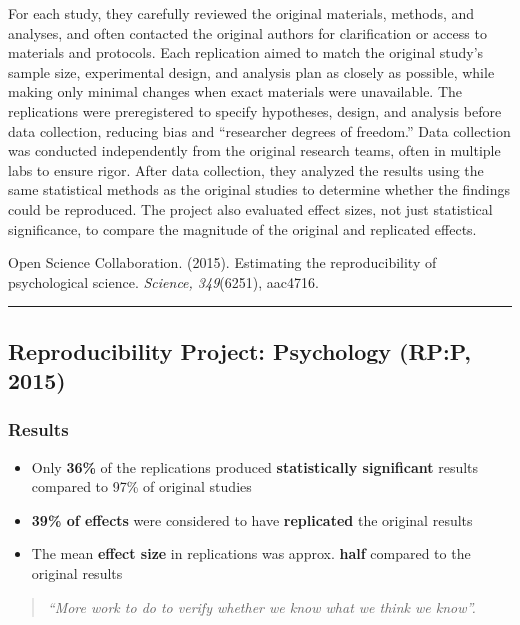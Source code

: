 \documentclass[
  english,
  letterpaper,
  DIV=11,
  numbers=noendperiod]{scrartcl}
\begin{document}
For each study, they carefully reviewed the original materials, methods,
and analyses, and often contacted the original authors for clarification
or access to materials and protocols. Each replication aimed to match
the original study's sample size, experimental design, and analysis plan
as closely as possible, while making only minimal changes when exact
materials were unavailable. The replications were preregistered to
specify hypotheses, design, and analysis before data collection,
reducing bias and ``researcher degrees of freedom.'' Data collection was
conducted independently from the original research teams, often in
multiple labs to ensure rigor. After data collection, they analyzed the
results using the same statistical methods as the original studies to
determine whether the findings could be reproduced. The project also
evaluated effect sizes, not just statistical significance, to compare
the magnitude of the original and replicated effects.

Open Science Collaboration. (2015). Estimating the reproducibility of
psychological science. \emph{Science, 349}(6251), aac4716.

\begin{center}\rule{0.5\linewidth}{0.5pt}\end{center}

\subsection{Reproducibility Project: Psychology (RP:P,
2015)}\label{reproducibility-project-psychology-rpp-2015-1}

\subsubsection{Results}\label{results}

\begin{itemize}
\item
  Only \textbf{36\%} of the replications produced \textbf{statistically
  significant} results compared to 97\% of original studies
\item
  \textbf{39\% of effects} were considered to have \textbf{replicated}
  the original results
\item
  The mean \textbf{effect size} in replications was approx.
  \textbf{half} compared to the original results
\end{itemize}

\begin{quote}
\emph{``More work to do to verify whether we know what we think we
know''.}
\end{quote}
\end{document}
